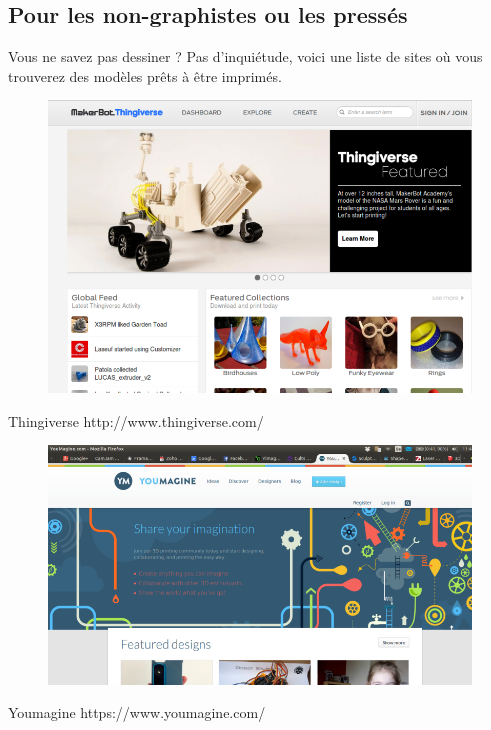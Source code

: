 \documentclass{article}
\begin{document}
\subsection{Pour les non-graphistes ou les pressés}
Vous ne savez pas dessiner ? Pas d'inquiétude, voici une liste de sites où vous trouverez des modèles prêts à être imprimés.
\begin{figure}[h!]
\centering
\includegraphics[scale=0.3]{./images/thingiverse.png}
\end{figure}\hfill 
 \par\leavevmode\par
Thingiverse
http://www.thingiverse.com/
\begin{figure}[h!]
\centering
\includegraphics[scale=0.3]{./images/youmagine.png}
\end{figure}\hfill 
 \par\leavevmode\par
Youmagine
https://www.youmagine.com/
\newpage
\end{document}
